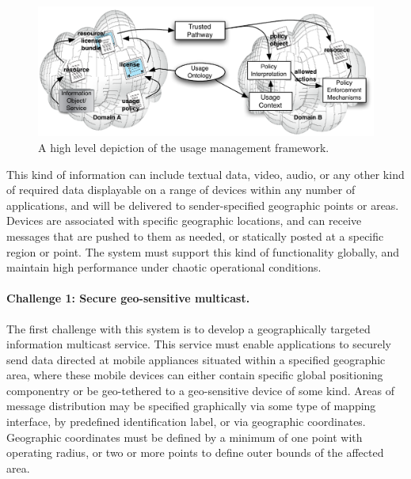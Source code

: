 \documentclass{sbir}
\begin{document}
\begin{figure}
  \centerline{\includegraphics[width=5.5in]{./images/UM-highlevel.pdf}}
  \caption{A high level depiction of the usage management framework.}
  \label{UM-highlevel}
 \end{figure}


This kind of information can include textual data, video, audio, or any other kind of required data displayable on a range of devices within any number of applications, and will be  delivered to sender-specified geographic points or areas. Devices are associated with specific geographic locations, and can receive messages that are pushed to them as needed, or statically posted at a specific region or point. The system must support this kind of functionality globally, and maintain high performance under chaotic operational conditions.

\paragraph{Challenge 1: Secure geo-sensitive multicast.} The first challenge with this system is to develop a geographically targeted information multicast service. This service must enable applications to securely send data directed at mobile appliances situated within a specified geographic area, where these mobile devices can either contain specific global positioning componentry or be geo-tethered to a geo-sensitive device of some kind. Areas of message distribution may be specified graphically via some type of mapping interface, by predefined identification label, or via geographic coordinates. Geographic coordinates must be defined by a minimum of one point with operating radius, or two or more points to define outer bounds of the affected area.
\end{document}
